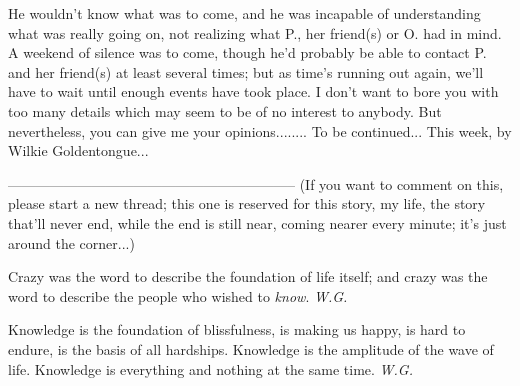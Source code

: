 He wouldn't know what was to come, and he was incapable of understanding what was really going on, not realizing what P., her friend(s) or O. had in mind. 
A weekend of silence was to come, though he'd probably be able to contact P. and her friend(s) at least several times; but as time's running out again, we'll have to wait until enough events have took place. 
I don't want to bore you with too many details which may seem to be of no interest to anybody. 
But nevertheless, you can give me your opinions........
To be continued...
This week, by Wilkie Goldentongue...

--------------------------------------------------------------
(If you want to comment on this, please start a new thread; this one is reserved for this story, my life, the story that'll never end, while the end is still near, coming nearer every minute; it's just around the corner...)

Crazy 
was the word 
to describe the foundation 
of life itself; 
and crazy was the word 
to describe the people 
who wished to \emph{know}. 
\emph{W.G.}

Knowledge 
is the foundation of blissfulness, 
is making us happy, 
is hard to endure, 
is the basis of all hardships. 
Knowledge 
is the amplitude 
of the wave of life. 
Knowledge 
is everything 
and nothing 
at the same time. 
\emph{W.G.}

